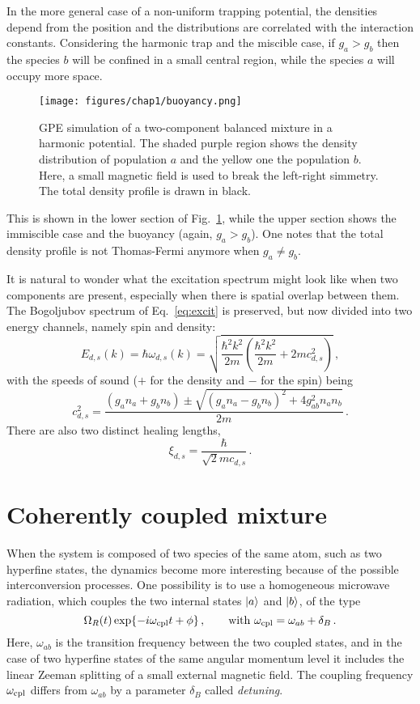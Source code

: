 In the more general case of a non-uniform trapping potential, the densities depend from the position and the distributions are correlated with the interaction constants. Considering the harmonic trap and the miscible case, if $g_a > g_b$ then the species $b$ will be confined in a small central region, while the species $a$ will occupy more space.
\begin{figure}[h!]
    \centering
    \texttt{[image: figures/chap1/buoyancy.png]}
    \caption{GPE simulation of a two-component balanced mixture in a harmonic potential. The shaded purple region shows the density distribution of population $a$ and the yellow one the population $b$. Here, a small magnetic field is used to break the left-right simmetry. The total density profile is drawn in black.} 
    \label{fig:buoy}
\end{figure}
This is shown in the lower section of Fig.\ \ref{fig:buoy}, while the upper section shows the immiscible case and the buoyancy (again, $g_a > g_b$). One notes that the total density profile is not Thomas-Fermi anymore when $g_a \neq g_b$.

It is natural to wonder what the excitation spectrum might look like when two components are present, especially when there is spatial overlap between them. The Bogoljubov spectrum of Eq.\ \eqref{eq:excit} is preserved, but now divided into two energy channels, namely spin and density:
\begin{equation*}
    E_{d,s}(k) = \hbar \omega_{d,s}(k) = \sqrt{\frac{\hbar^2 k^2}{2m}\left(\frac{\hbar^2 k^2}{2m} + 2mc_{d,s}^2\right)}\, ,
\end{equation*}
with the speeds of sound ($+$ for the density and $-$ for the spin) being
\begin{equation*}
    c_{d,s}^2 = \frac{(g_a n_a + g_b n_b) \pm \sqrt{(g_a n_a - g_b n_b)^2 + 4g_{ab}^2 n_a n_b}}{2m}\, .
\end{equation*}
There are also two distinct healing lengths,
\begin{equation*}
    \xi_{d,s} = \frac{\hbar}{\sqrt{2}mc_{d,s}}\, .
\end{equation*}

\section{Coherently coupled mixture}
When the system is composed of two species of the same atom, such as two hyperfine states, the dynamics become more interesting because of the possible interconversion processes. One possibility is to use a homogeneous microwave radiation, which couples the two internal states $\ket{a}$ and $\ket{b}$, of the type
\begin{equation*}
    \Omega_R(t) \exp{-i\omega_{\rm cpl}t + \phi}\, ,\qquad \text{with }
    \omega_{\rm cpl} = \omega_{ab} + \delta_B\, .
\end{equation*}
Here, $\omega_{ab}$ is the transition frequency between the two coupled states, and in the case of two hyperfine states of the same angular momentum level it includes the linear Zeeman splitting of a small external magnetic field. The coupling frequency $\omega_{\rm cpl}$ differs from $\omega_{ab}$ by a parameter $\delta_B$ called \textit{detuning}.

